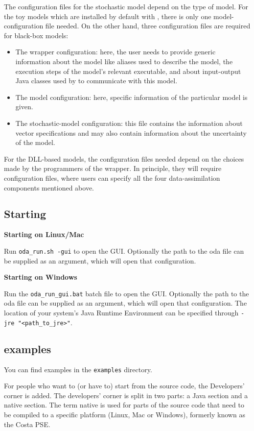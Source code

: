 The configuration files for the stochastic model depend on the type of model. For the toy models which are installed by default with \oda, there is only one model-configuration file needed. On the other hand, three configuration files are required for black-box models: 
\begin{itemize}
\item The wrapper configuration: here, the user needs to provide generic information about the model like aliases used to describe the model, the execution steps of the model’s relevant executable, and about input-output Java classes used by \oda to communicate with this model.
\item The model configuration: here, specific information of the particular model is given.
\item The stochastic-model configuration: this file contains the information about vector specifications and may also contain information about the uncertainty of the model. 
\end{itemize}
For the DLL-based models, the configuration files needed depend on the choices made by the programmers of the \oda wrapper. In principle, they will require configuration files, where users can specify all the four data-assimilation components mentioned above. 

\subsection{Starting \oda}
\textbf{Starting \oda on Linux/Mac}

Run \verb|oda_run.sh -gui| to open the \oda GUI. Optionally the path to the oda file can be supplied as an argument, which will open that \oda configuration.

\textbf{Starting \oda on Windows}

Run the \verb|oda_run_gui.bat| batch file to open the \oda GUI. Optionally the path to the oda file can be supplied as an argument, which will open that \oda configuration. The location of your system's Java Runtime Environment can be specified through \verb|-jre "<path_to_jre>"|.

\subsection{\oda examples}
You can find examples in the \verb|examples| directory.

For people who want to (or have to) start from the \oda source code, the Developers' corner is added. The developers' corner is split in two parts: a Java section and a native section. The term native is used for parts of the source code that need to be compiled to a specific platform (Linux, Mac or Windows), formerly known as the Costa PSE.

